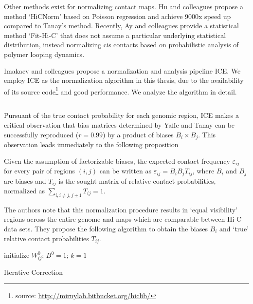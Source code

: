 Other methods exist for normalizing contact maps.  Hu and colleagues propose a method `HiCNorm' based on Poisson regression and achieve
9000x speed up compared to Tanay's method\cite{hu2012}.  Recently, Ay and colleagues provide a statistical method `Fit-Hi-C' that does
not assume a particular underlying statistical distribution, instead normalizing cis contacts based on probabilistic analysis of polymer looping
dynamics\cite{ay2014}.

Imakaev and colleagues propose a normalization and analysis pipeline \gls{ICE}\cite{imakaev2012}.  We employ \gls{ICE} as the normalization
algorithm in this thesis, due to the availability of its source code\footnote{source: \url{http://mirnylab.bitbucket.org/hiclib/}} and good
performance.   We analyze the algorithm in detail.

\subsection*{}

Pursuant of the true contact probability for each genomic region, \gls{ICE} makes a critical observation that bias matrices determined by
Yaffe and Tanay\cite{yaffe2011} can be successfully reproduced ($r = 0.99$) by a product of biases $B_i \times B_j$.  This observation leads
immediately to the following proposition

\begin{prop}
  Given the assumption of factorizable biases, the expected contact frequency $\varepsilon_{ij}$ for every pair of regions $(i,j)$ can
  be written as $\varepsilon_{ij} = B_{i}B_{j}T_{ij}$, where $B_i$ and $B_j$ are biases and $T_{ij}$ is the sought matrix of relative contact
  probabilities, normalized as $\sum_{i, i \neq j, j \pm 1}T_{ij} = 1$.
\end{prop}

The authors note that this normalization procedure results in `equal visibility' regions across the entire genome and maps which are
comparable between Hi-C data sets.  They propose the following algorithm to obtain the biases $B_i$ and `true' relative contact probabilities
$T_{ij}$.

\begin{algorithm}[H]
  initialize $W^{0}_{ij}$; $B^0 = 1$; $k = 1$\;
  \caption{Iterative Correction}
\end{algorithm}

